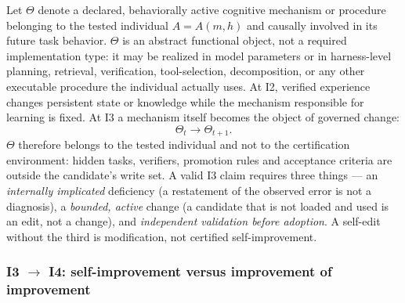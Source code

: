 \documentclass[11pt]{article}
\theoremstyle{definition}
\begin{document}
Let $\Theta$ denote a declared, behaviorally active cognitive mechanism or procedure belonging to the tested individual $A = A(m,h)$ and causally involved in its future task behavior. $\Theta$ is an abstract functional object, not a required implementation type: it may be realized in model parameters or in harness-level planning, retrieval, verification, tool-selection, decomposition, or any other executable procedure the individual actually uses. At I2, verified experience changes persistent state or knowledge while the mechanism responsible for learning is fixed. At I3 a mechanism itself becomes the object of governed change:
\begin{equation}
\Theta_t \longrightarrow \Theta_{t+1}.
\end{equation}
$\Theta$ therefore belongs to the tested individual and not to the certification environment: hidden tasks, verifiers, promotion rules and acceptance criteria are outside the candidate's write set. A valid I3 claim requires three things --- an \emph{internally implicated} deficiency (a restatement of the observed error is not a diagnosis), a \emph{bounded, active} change (a candidate that is not loaded and used is an edit, not a change), and \emph{independent validation before adoption}. A self-edit without the third is modification, not certified self-improvement.

\subsubsection{I3 $\to$ I4: self-improvement versus improvement of improvement}\label{sec:psi}
\end{document}
